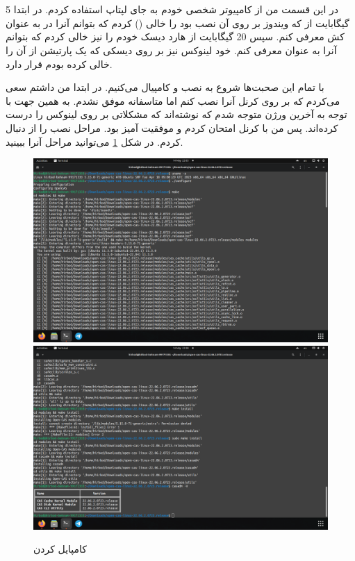 \section{}
در این قسمت من از کامپیوتر شخصی خودم به جای لپتاپ استفاده کردم. در ابتدا 5 گیگابایت از
که ویندوز بر روی آن نصب بود را خالی
()
کردم که بتوانم آنرا در
به عنوان کش معرفی کنم. سپس 20 گیگابایت از هارد دیسک خودم را نیز خالی کردم که بتوانم آنرا به عنوان
معرفی کنم. خود لینوکس نیز بر روی دیسکی که یک پارتیشن از آن را خالی کرده بودم قرار دارد.

با تمام این صحبت‌ها شروع به نصب و کامپیال
می‌کنیم. در ابتدا من داشتم سعی می‌کردم که بر روی کرنل
آنرا نصب کنم اما متاسفانه موفق نشدم. به همین جهت با توجه به
آخرین ورژن
متوجه شدم که نوشته‌اند که مشکلاتی بر روی لینوکس
را درست کرده‌اند. پس من با کرنل
امتحان کردم و موفقیت آمیز بود. مراحل نصب را از
دنبال کردم. در شکل
\ref{fig:openCAS_compile}
می‌توانید مراحل آنرا ببینید.
\begin{figure}[H]
    \centering
    \includegraphics[scale=0.25]{pic/3-compile-1.png}
    \includegraphics[scale=0.25]{pic/3-compile-2.png}
    \caption{کامپایل کردن }
    \label{fig:openCAS_compile}
\end{figure}


